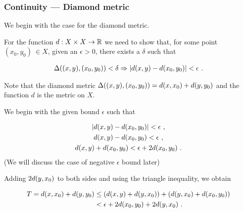 \begin{frame}
    \frametitle{Continuity --- Diamond metric}

    We begin with the case for the
    diamond metric.

    \pause

    For the function \(d: X\times X \to \mathbb{R}\) we need to show that, for some point \((x_0, y_0)\ \in X \),
    given an \(\epsilon > 0\), there exists a \(\delta\) such that 

    \begin{gather}
        \Delta((x, y), (x_0, y_0)) < \delta \Rightarrow |d(x, y) - d(x_0, y_0)| < \epsilon~.
    \end{gather}

    Note that the diamond metric \(\Delta((x, y), (x_0, y_0)) = d(x, x_0) + d(y, y_0)\)
    and the function \(d\) is the metric on \(X\).

    
\end{frame}

\begin{frame}
    We begin with the given bound \(\epsilon\) such that

    \begin{gather}
        |d(x, y) - d(x_0, y_0)| < \epsilon~, \nonumber\\
        d(x, y) - d(x_0, y_0) < \epsilon~,  \nonumber\\
        d(x, y) +d(x_0, y_0)< \epsilon + 2d(x_0, y_0)~.
    \end{gather}
    (We will discuss the case of negative \(\epsilon\) bound later)
    \pause

    Adding \(2d(y, x_0)\) to both sides and using the triangle inequality,
    we obtain

    \begin{tcolorbox}[colframe=red, colback=red!10!white]
        \begin{align}
            T = d(x, x_0) + d(y, y_0) &\leq (d(x, y) + d(y, x_0)) + (d(y, x_0)+d(x_0, y_0)) \nonumber\\ 
            &< \epsilon + 2d(x_0, y_0) + 2d(y, x_0)~.
            \label{eqn:tresult}
        \end{align}
    \end{tcolorbox}

\end{frame}

